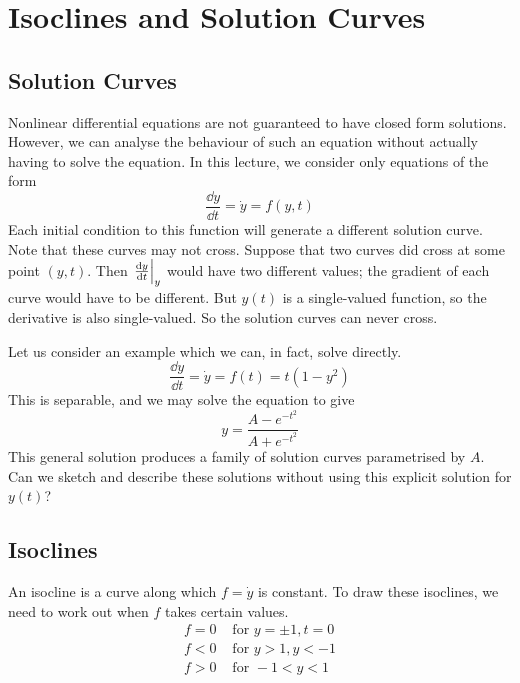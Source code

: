 \documentclass{article}
\begin{document}
	\section{Isoclines and Solution Curves}
	\subsection{Solution Curves}
	Nonlinear differential equations are not guaranteed to have closed form solutions. However, we can analyse the behaviour of such an equation without actually having to solve the equation. In this lecture, we consider only equations of the form
	\[ \frac{\dd y}{\dd t} = \dot y = f(y, t) \]
	Each initial condition to this function will generate a different solution curve. Note that these curves may not cross. Suppose that two curves did cross at some point $(y, t)$. Then $\eval{\frac{\dd y}{\dd t}}_y$ would have two different values; the gradient of each curve would have to be different. But $y(t)$ is a single-valued function, so the derivative is also single-valued. So the solution curves can never cross.

	Let us consider an example which we can, in fact, solve directly.
	\[ \frac{\dd y}{\dd t} = \dot y = f(t) = t(1 - y^2) \]
	This is separable, and we may solve the equation to give
	\[ y = \frac{A - e^{-t^2}}{A + e^{-t^2}} \]
	This general solution produces a family of solution curves parametrised by $A$. Can we sketch and describe these solutions without using this explicit solution for $y(t)$?

	\subsection{Isoclines}
	An isocline is a curve along which $f = \dot y$ is constant. To draw these isoclines, we need to work out when $f$ takes certain values.
	\begin{align*}
		f = 0 &\text{ for } y = \pm 1, t = 0 \\
		f < 0 &\text{ for } y > 1, y < -1 \\
		f > 0 &\text{ for } -1 < y < 1
	\end{align*}
	
\end{document}
